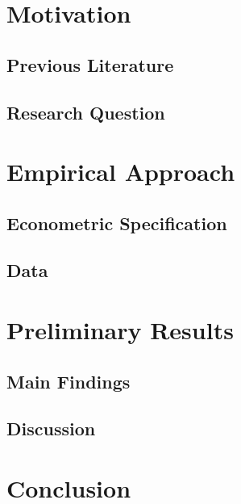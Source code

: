 \documentclass[11pt, aspectratio=1610, xcolor={dvipsnames}]{beamer}
\begin{document}
	\section{Motivation}
	\begin{frame}
		\frametitle{}
	\end{frame}
	
	\subsection{Previous Literature}
	\begin{frame}
		\frametitle{}
	\end{frame}
	
	\subsection{Research Question}
	\begin{frame}
		\frametitle{}
	\end{frame}
	
	\section{Empirical Approach}
	\begin{frame}
		\frametitle{}
	\end{frame}
	
	\subsection{Econometric Specification}
	\begin{frame}
		\frametitle{}
	\end{frame}
	
	\subsection{Data}
	\begin{frame}
		\frametitle{}
	\end{frame}
	
	\section{Preliminary Results}
	\begin{frame}
		\frametitle{}
	\end{frame}
	
	\subsection{Main Findings}
	\begin{frame}
		\frametitle{}
	\end{frame}
	
	\subsection{Discussion}
	\begin{frame}
		\frametitle{}
	\end{frame}
	
	\section{Conclusion}
	\begin{frame}
		\frametitle{}
	\end{frame}
\end{document}
